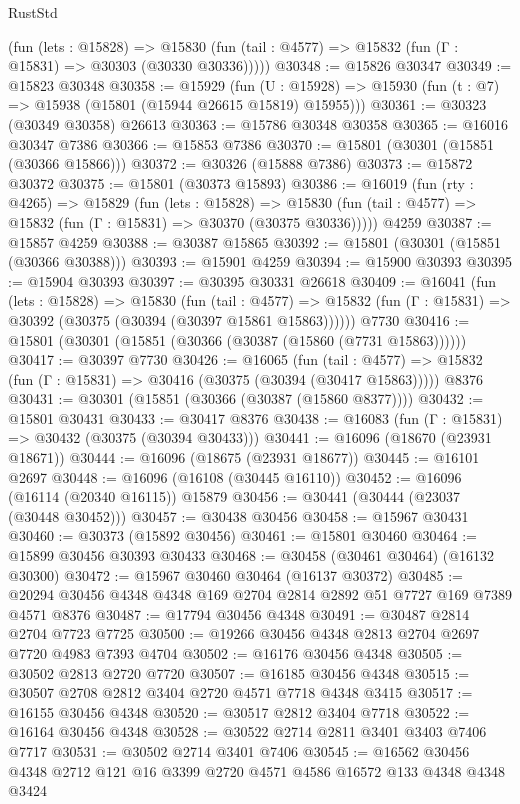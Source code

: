 \begin{lexlean}{RustStd}
\begin{coremodule}
      (fun (lets : @15828) =>
      @15830 (fun (tail : @4577) => @15832 (fun (Γ : @15831) => @30303 (@30330 @30336)))))
@30348 := @15826 @30347
@30349 := @15823 @30348
@30358 := @15929
    (fun (U : @15928) => @15930 (fun (t : @7) => @15938 (@15801 (@15944 @26615 @15819) @15955)))
@30361 := @30323 (@30349 @30358) @26613
@30363 := @15786 @30348 @30358
@30365 := @16016 @30347 @7386
@30366 := @15853 @7386
@30370 := @15801 (@30301 (@15851 (@30366 @15866)))
@30372 := @30326 (@15888 @7386)
@30373 := @15872 @30372
@30375 := @15801 (@30373 @15893)
@30386 := @16019
    (fun (rty : @4265) =>
    @15829
      (fun (lets : @15828) =>
      @15830 (fun (tail : @4577) => @15832 (fun (Γ : @15831) => @30370 (@30375 @30336)))))
    @4259
@30387 := @15857 @4259
@30388 := @30387 @15865
@30392 := @15801 (@30301 (@15851 (@30366 @30388)))
@30393 := @15901 @4259
@30394 := @15900 @30393
@30395 := @15904 @30393
@30397 := @30395 @30331 @26618
@30409 := @16041
    (fun (lets : @15828) =>
    @15830
      (fun (tail : @4577) =>
      @15832 (fun (Γ : @15831) => @30392 (@30375 (@30394 (@30397 @15861 @15863))))))
    @7730
@30416 := @15801 (@30301 (@15851 (@30366 (@30387 (@15860 (@7731 @15863))))))
@30417 := @30397 @7730
@30426 := @16065
    (fun (tail : @4577) => @15832 (fun (Γ : @15831) => @30416 (@30375 (@30394 (@30417 @15863)))))
    @8376
@30431 := @30301 (@15851 (@30366 (@30387 (@15860 @8377))))
@30432 := @15801 @30431
@30433 := @30417 @8376
@30438 := @16083 (fun (Γ : @15831) => @30432 (@30375 (@30394 @30433)))
@30441 := @16096 (@18670 (@23931 @18671))
@30444 := @16096 (@18675 (@23931 @18677))
@30445 := @16101 @2697
@30448 := @16096 (@16108 (@30445 @16110))
@30452 := @16096 (@16114 (@20340 @16115)) @15879
@30456 := @30441 (@30444 (@23037 (@30448 @30452)))
@30457 := @30438 @30456
@30458 := @15967 @30431
@30460 := @30373 (@15892 @30456)
@30461 := @15801 @30460
@30464 := @15899 @30456 @30393 @30433
@30468 := @30458 (@30461 @30464) (@16132 @30300)
@30472 := @15967 @30460 @30464 (@16137 @30372)
@30485 := @20294 @30456 @4348 @4348 @169 @2704 @2814 @2892 @51 @7727 @169 @7389 @4571 @8376
@30487 := @17794 @30456 @4348
@30491 := @30487 @2814 @2704 @7723 @7725
@30500 := @19266 @30456 @4348 @2813 @2704 @2697 @7720 @4983 @7393 @4704
@30502 := @16176 @30456 @4348
@30505 := @30502 @2813 @2720 @7720
@30507 := @16185 @30456 @4348
@30515 := @30507 @2708 @2812 @3404 @2720 @4571 @7718 @4348 @3415
@30517 := @16155 @30456 @4348
@30520 := @30517 @2812 @3404 @7718
@30522 := @16164 @30456 @4348
@30528 := @30522 @2714 @2811 @3401 @3403 @7406 @7717
@30531 := @30502 @2714 @3401 @7406
@30545 := @16562 @30456 @4348 @2712 @121 @16 @3399 @2720 @4571 @4586 @16572 @133 @4348 @4348 @3424

\end{coremodule}
\end{lexlean}
